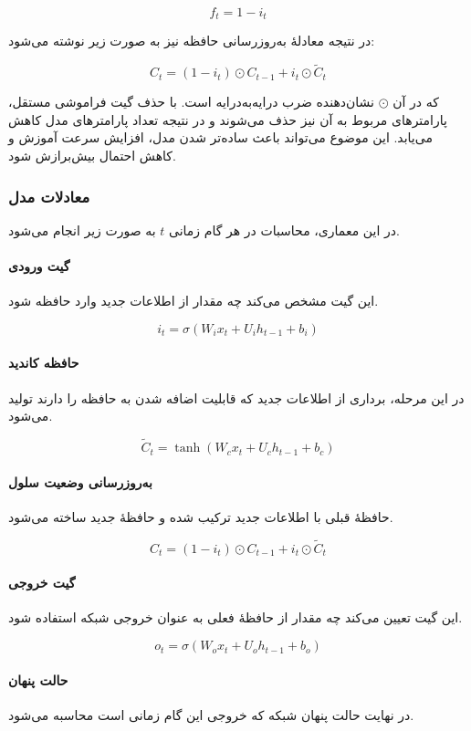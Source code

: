 \documentclass{article}
\begin{document}
\[
f_t = 1 - i_t
\]

در نتیجه معادلۀ به‌روزرسانی حافظه نیز به صورت زیر نوشته می‌شود:

\[
C_t = (1 - i_t) \odot C_{t-1} + i_t \odot \tilde{C}_t
\]

که در آن $\odot$ نشان‌دهنده ضرب درایه‌به‌درایه است. با حذف گیت فراموشی مستقل، پارامترهای مربوط به آن نیز حذف می‌شوند و در نتیجه تعداد پارامترهای مدل کاهش می‌یابد. این موضوع می‌تواند باعث ساده‌تر شدن مدل، افزایش سرعت آموزش و کاهش احتمال بیش‌برازش شود.

\subsubsection{معادلات مدل}

در این معماری، محاسبات در هر گام زمانی $t$ به صورت زیر انجام می‌شود.

\paragraph{گیت ورودی}
این گیت مشخص می‌کند چه مقدار از اطلاعات جدید وارد حافظه شود.

\[
i_t = \sigma(W_i x_t + U_i h_{t-1} + b_i)
\]

\paragraph{حافظه کاندید}
در این مرحله، برداری از اطلاعات جدید که قابلیت اضافه شدن به حافظه را دارند تولید می‌شود.

\[
\tilde{C}_t = \tanh(W_c x_t + U_c h_{t-1} + b_c)
\]

\paragraph{به‌روزرسانی وضعیت سلول}
حافظۀ قبلی با اطلاعات جدید ترکیب شده و حافظۀ جدید ساخته می‌شود.

\[
C_t = (1 - i_t) \odot C_{t-1} + i_t \odot \tilde{C}_t
\]

\paragraph{گیت خروجی}
این گیت تعیین می‌کند چه مقدار از حافظۀ فعلی به عنوان خروجی شبکه استفاده شود.

\[
o_t = \sigma(W_o x_t + U_o h_{t-1} + b_o)
\]

\paragraph{حالت پنهان}
در نهایت حالت پنهان شبکه که خروجی این گام زمانی است محاسبه می‌شود.
\end{document}

